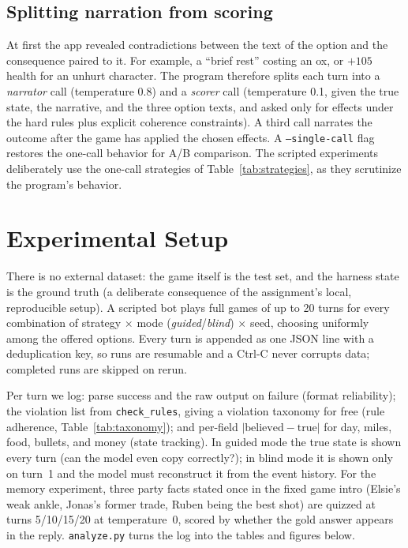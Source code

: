 \documentclass{article}
\begin{document}
\subsection{Splitting narration from scoring}
\label{sec:split}
At first the app revealed contradictions between the text of the option and the
consequence paired to it.
For example, a ``brief rest'' costing an ox, or $+105$ health for an unhurt character.
The program therefore splits each turn into a \emph{narrator} call (temperature 0.8) and a
\emph{scorer} call (temperature 0.1, given the true state, the narrative, and the three
option texts, and asked only for effects under the hard rules plus explicit coherence
constraints).
A third call narrates the outcome after the game has applied the chosen effects.
A \texttt{--single-call} flag restores the one-call behavior for A/B comparison.
The scripted experiments deliberately use the one-call strategies of
Table~\ref{tab:strategies}, as they scrutinize the program's behavior.

\section{Experimental Setup}
There is no external dataset: the game itself is the test set, and the harness state is the
ground truth (a deliberate consequence of the assignment's local, reproducible setup). A
scripted bot plays full games of up to 20 turns for every combination of strategy $\times$
mode (\emph{guided}/\emph{blind}) $\times$ seed, choosing uniformly among the offered
options. Every turn is appended as one JSON line with a deduplication key, so runs are
resumable and a Ctrl-C never corrupts data; completed runs are skipped on rerun.

Per turn we log: parse success and the raw output on failure (format reliability); the
violation list from \texttt{check\_rules}, giving a violation taxonomy for free (rule
adherence, Table~\ref{tab:taxonomy}); and per-field $|\text{believed}-\text{true}|$ for
day, miles, food, bullets, and money (state tracking). In guided mode the true state is
shown every turn (can the model even copy correctly?); in blind mode it is shown only on
turn~1 and the model must reconstruct it from the event history. For the memory
experiment, three party facts stated once in the fixed game intro (Elsie's weak ankle,
Jonas's former trade, Ruben being the best shot) are quizzed at turns 5/10/15/20 at
temperature~0, scored by whether the gold answer appears in the reply. \texttt{analyze.py}
turns the log into the tables and figures below.
\end{document}
